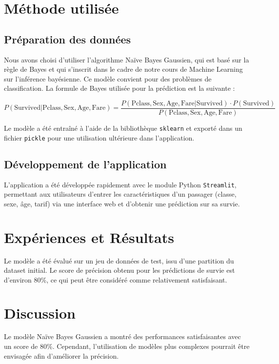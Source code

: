 \documentclass{rapportECL}
\begin{document}
\section{Méthode utilisée} 


\subsection{Préparation des données}
Nous avons choisi d'utiliser l'algorithme Naïve Bayes Gaussien, qui est basé sur la règle de Bayes et qui s’inscrit dans le cadre de notre cours de Machine Learning sur l’inférence bayésienne. Ce modèle convient pour des problèmes de classification. La formule de Bayes utilisée pour la prédiction est la suivante :

\[
P(\text{Survived} | \text{Pclass}, \text{Sex}, \text{Age}, \text{Fare}) = \frac{P(\text{Pclass}, \text{Sex}, \text{Age}, \text{Fare} | \text{Survived}) \cdot P(\text{Survived})}{P(\text{Pclass}, \text{Sex}, \text{Age}, \text{Fare})}
\]

Le modèle a été entraîné à l'aide de la bibliothèque \texttt{sklearn} et exporté dans un fichier \texttt{pickle} pour une utilisation ultérieure dans l'application.

\subsection{Développement de l'application}
L'application a été développée rapidement avec le module Python \texttt{Streamlit}, permettant aux utilisateurs d'entrer les 
caractéristiques d'un passager (classe, sexe, âge, tarif) via une interface web et d'obtenir une prédiction sur sa survie.

\section{Expériences et Résultats}
Le modèle a été évalué sur un jeu de données de test, issu d'une partition du dataset initial. Le score de précision obtenu pour les prédictions de survie est d'environ 80\%, ce qui peut être considéré comme relativement satisfaisant.

\section{Discussion}
Le modèle Naïve Bayes Gaussien a montré des performances satisfaisantes avec un score de 80\%. Cependant, l'utilisation de modèles plus complexes pourrait être envisagée afin d'améliorer la précision.  
\end{document}
